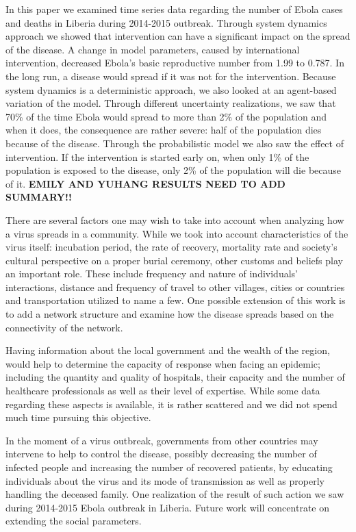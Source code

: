 In this paper we examined time series data  regarding the number of Ebola cases and deaths in Liberia during 2014-2015 outbreak. Through system dynamics approach we showed that intervention can have a significant impact on the spread of the disease. A change in model parameters, caused by international intervention, decreased Ebola's basic reproductive number from 1.99 to 0.787. In the long run, a disease would spread if it was not for the intervention. Because system dynamics is a deterministic approach, we also looked at an agent-based variation of the model. Through different uncertainty realizations, we saw that  70\% of the time Ebola would spread to more than 2\% of the population and when it does, the consequence are rather severe: half of the population dies because of the disease. Through the probabilistic model we also saw the effect of intervention. If the intervention is started early on, when only 1\% of the population is exposed to the disease, only 2\% of the population will die because of it.  \textbf{EMILY AND YUHANG RESULTS
NEED TO ADD SUMMARY!!}

There are several factors one may wish to take into account when analyzing how a virus spreads in a community. While we took into account characteristics of the virus itself: incubation period, the rate of recovery, mortality rate and society's cultural perspective on a proper burial ceremony, other customs and beliefs play an important role. These include frequency and nature of individuals' interactions, distance and frequency of travel to other villages, cities or countries and transportation utilized to name a few. One possible extension of this work is to add a network structure and examine how the disease spreads based on the connectivity of the network.

Having information about the local government and the wealth of the region, would help to determine the capacity of response when facing an epidemic; including the quantity and quality of hospitals, their capacity and the number of healthcare professionals as well as 
their level of  expertise. While some data regarding these aspects is available, it is rather scattered and we did not spend much time pursuing this objective. 

In the moment of a virus outbreak, governments from other countries may intervene to help to control the disease, possibly decreasing the number of infected people and increasing the number of recovered patients, by educating individuals about the virus and its mode of transmission as well as properly handling the deceased family. One realization of the result of such action we saw during 2014-2015 Ebola outbreak in Liberia. Future work will concentrate on extending the social parameters. 

